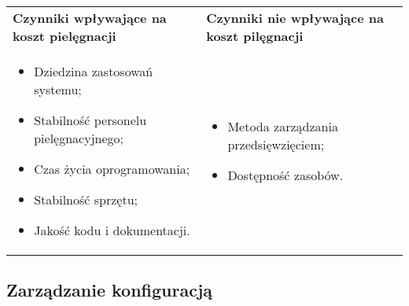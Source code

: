 \documentclass[../main.tex]{subfiles}
\begin{document}
    \begin{table}[H]
        \begin{center}
            \begin{tabular}{p{.5\linewidth} p{.5\linewidth}}
                \textbf{Czynniki wpływające na koszt pielęgnacji} & \textbf{Czynniki nie wpływające na koszt pilęgnacji}\\

                \begin{itemize}
                    \item  Dziedzina zastosowań systemu;
                    \item Stabilność personelu pielęgnacyjnego;
                    \item Czas życia oprogramowania;
                    \item Stabilność sprzętu;
                    \item Jakość kodu i dokumentacji.
                \end{itemize}
                &
                \begin{itemize}
                    \item Metoda zarządzania przedsięwzięciem;
                    \item Dostępność zasobów.
                \end{itemize}
            \end{tabular}
        \end{center}
    \end{table}

    \subsection{Zarządzanie konfiguracją}
\end{document}
